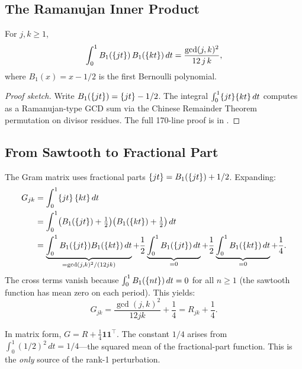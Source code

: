 \documentclass[11pt,a4paper]{article}
\begin{document}
\subsection{The Ramanujan Inner Product}

\begin{theorem}
\label{thm:ramanujan-ip}
For $j, k \geq 1$,
\[
  \int_0^1 B_1(\{jt\})\,B_1(\{kt\})\,dt
  = \frac{\gcd(j,k)^2}{12\,j\,k},
\]
where $B_1(x) = x - 1/2$ is the first Bernoulli polynomial.
\end{theorem}

\begin{proof}[Proof sketch]
Write $B_1(\{jt\}) = \{jt\} - 1/2$. The integral
$\int_0^1 \{jt\}\{kt\}\,dt$ computes as a
Ramanujan-type GCD sum via the Chinese Remainder Theorem
permutation on divisor residues. The full 170-line proof is in
.
\end{proof}

\subsection{From Sawtooth to Fractional Part}

The Gram matrix uses fractional parts
$\{jt\} = B_1(\{jt\}) + 1/2$. Expanding:
\begin{align*}
  G_{jk} &= \int_0^1 \{jt\}\,\{kt\}\,dt \\
  &= \int_0^1 \bigl(B_1(\{jt\}) + \tfrac{1}{2}\bigr)
     \bigl(B_1(\{kt\}) + \tfrac{1}{2}\bigr)\,dt \\
  &= \underbrace{\int_0^1 B_1(\{jt\})B_1(\{kt\})\,dt}
     _{= \gcd(j,k)^2/(12jk)}
   + \frac{1}{2}\underbrace{\int_0^1 B_1(\{jt\})\,dt}_{= 0}
   + \frac{1}{2}\underbrace{\int_0^1 B_1(\{kt\})\,dt}_{= 0}
   + \frac{1}{4}.
\end{align*}
The cross terms vanish because $\int_0^1 B_1(\{nt\})\,dt = 0$
for all $n \geq 1$ (the sawtooth function has mean zero on each
period). This yields:
\[
  G_{jk} = \frac{\gcd(j,k)^2}{12jk} + \frac{1}{4}
  = R_{jk} + \frac{1}{4}.
\]

\begin{remark}
In matrix form, $G = R + \frac{1}{4}\mathbf{1}\mathbf{1}^\top$.
The constant $1/4$ arises from $\int_0^1 (1/2)^2\,dt = 1/4$---the
squared mean of the fractional-part function. This is the
\emph{only} source of the rank-1 perturbation.
\end{remark}
\end{document}

